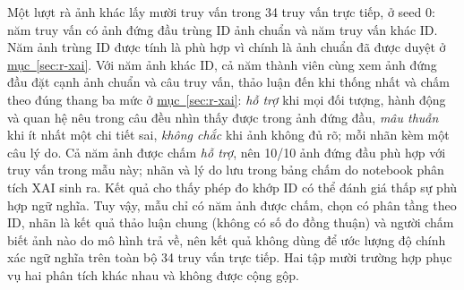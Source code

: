 Một lượt rà ảnh khác lấy mười truy vấn trong 34 truy vấn trực tiếp, ở seed 0: năm truy vấn có ảnh đứng đầu trùng ID ảnh chuẩn và năm truy vấn khác ID. Năm ảnh trùng ID được tính là phù hợp vì chính là ảnh chuẩn đã được duyệt ở \hyperref[sec:r-xai]{mục~\ref*{sec:r-xai}}. Với năm ảnh khác ID, cả năm thành viên cùng xem ảnh đứng đầu đặt cạnh ảnh chuẩn và câu truy vấn, thảo luận đến khi thống nhất và chấm theo đúng thang ba mức ở \hyperref[sec:r-xai]{mục~\ref*{sec:r-xai}}: \emph{hỗ trợ} khi mọi đối tượng, hành động và quan hệ nêu trong câu đều nhìn thấy được trong ảnh đứng đầu, \emph{mâu thuẫn} khi ít nhất một chi tiết sai, \emph{không chắc} khi ảnh không đủ rõ; mỗi nhãn kèm một câu lý do. Cả năm ảnh được chấm \emph{hỗ trợ}, nên 10/10 ảnh đứng đầu phù hợp với truy vấn trong mẫu này; nhãn và lý do lưu trong bảng chấm do notebook phân tích XAI sinh ra. Kết quả cho thấy phép đo khớp ID có thể đánh giá thấp sự phù hợp ngữ nghĩa. Tuy vậy, mẫu chỉ có năm ảnh được chấm, chọn có phân tầng theo ID, nhãn là kết quả thảo luận chung (không có số đo đồng thuận) và người chấm biết ảnh nào do mô hình trả về, nên kết quả không dùng để ước lượng độ chính xác ngữ nghĩa trên toàn bộ 34 truy vấn trực tiếp. Hai tập mười trường hợp phục vụ hai phân tích khác nhau và không được cộng gộp.
